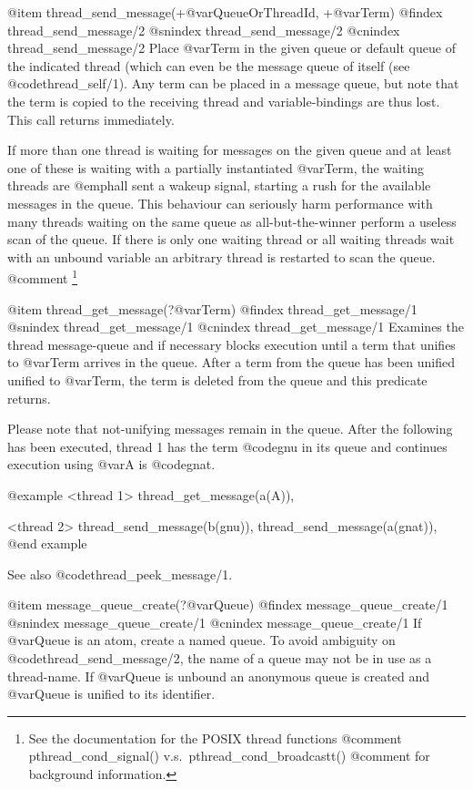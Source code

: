 {{{{{{{{@item thread_send_message(+@var{QueueOrThreadId}, +@var{Term})
@findex thread_send_message/2
@snindex thread_send_message/2
@cnindex thread_send_message/2
Place @var{Term} in the given queue or default queue of the indicated
thread (which can even be the message queue of itself (see
@code{thread_self/1}). Any term can be placed in a message queue, but note that
the term is copied to the receiving thread and variable-bindings are
thus lost. This call returns immediately.

If more than one thread is waiting for messages on the given queue and
at least one of these is waiting with a partially instantiated
@var{Term}, the waiting threads are @emph{all} sent a wakeup signal,
starting a rush for the available messages in the queue.  This behaviour
can seriously harm performance with many threads waiting on the same
queue as all-but-the-winner perform a useless scan of the queue. If
there is only one waiting thread or all waiting threads wait with an
unbound variable an arbitrary thread is restarted to scan the queue.
@comment	\footnote{See the documentation for the POSIX thread functions
@comment		  pthread_cond_signal() v.s.\ pthread_cond_broadcastt()
@comment		  for background information.}

@item thread_get_message(?@var{Term})
@findex thread_get_message/1
@snindex thread_get_message/1
@cnindex thread_get_message/1
Examines the thread message-queue and if necessary blocks execution
until a term that unifies to @var{Term} arrives in the queue.  After
a term from the queue has been unified unified to @var{Term}, the
term is deleted from the queue and this predicate returns.

Please note that not-unifying messages remain in the queue.  After
the following has been executed, thread 1 has the term @code{gnu}
in its queue and continues execution using @var{A} is @code{gnat}.

@example
   <thread 1>
   thread_get_message(a(A)),

   <thread 2>
   thread_send_message(b(gnu)),
   thread_send_message(a(gnat)),
@end example

See also @code{thread_peek_message/1}.

@item message_queue_create(?@var{Queue})
@findex message_queue_create/1
@snindex message_queue_create/1
@cnindex message_queue_create/1
If @var{Queue} is an atom, create a named queue.  To avoid ambiguity
on @code{thread_send_message/2}, the name of a queue may not be in use
as a thread-name.  If @var{Queue} is unbound an anonymous queue is
created and @var{Queue} is unified to its identifier.

}}}}}}}}
